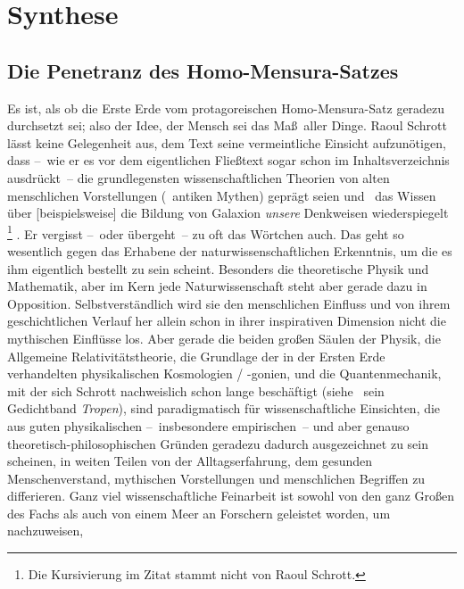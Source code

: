 \chapter{Synthese}\label{ch:synthese} %

\section{Die Penetranz des Homo-Mensura-Satzes}

Es ist, als ob die Erste Erde vom protagoreischen Homo-Mensura-Satz geradezu
  durchsetzt sei; also der Idee, der Mensch sei das Ma\ss\ aller Dinge.
Raoul Schrott lässt keine Gelegenheit aus, dem Text seine vermeintliche Einsicht
  aufzunötigen, dass --~wie er es vor dem eigentlichen Fließtext sogar schon im
  Inhaltsverzeichnis ausdrückt~-- die grundlegensten wissenschaftlichen
  Theorien von alten menschlichen Vorstellungen (\zB\ antiken Mythen) geprägt seien
  und \zB\ \glqq das Wissen über [beispielsweise] die Bildung von Galaxion 
  \emph{unsere} Denkweisen wiederspiegelt\grqq
  \footnote{Die Kursivierung im Zitat stammt nicht von Raoul Schrott.}
  \citep[S. 5]{Schrott2016ErsteErde}.
Er vergisst --~oder übergeht~-- zu oft das Wörtchen \glqq auch\grqq.
Das geht so wesentlich gegen das Erhabene der naturwissenschaftlichen
  Erkenntnis, um die es ihm eigentlich bestellt zu sein scheint. 
Besonders die theoretische Physik und Mathematik, aber im Kern jede
  Naturwissenschaft steht aber gerade dazu in Opposition.
Selbstverständlich wird sie den menschlichen Einfluss und von ihrem
  geschichtlichen Verlauf her allein schon in ihrer inspirativen Dimension
  nicht die mythischen Einflüsse los.
Aber gerade die beiden großen Säulen der Physik, die Allgemeine
  Relativitätstheorie, die Grundlage der in der Ersten Erde verhandelten
  physikalischen Kosmologien / -gonien, und die Quantenmechanik, mit der sich
  Schrott nachweislich schon lange beschäftigt (siehe \zB\ sein Gedichtband
  \emph{Tropen}), sind paradigmatisch für wissenschaftliche Einsichten, die
  aus guten physikalischen --~insbesondere empirischen~-- und aber genauso 
  theoretisch-philosophischen Gründen geradezu dadurch ausgezeichnet zu sein
  scheinen, in weiten Teilen von der Alltagserfahrung, dem gesunden
  Menschenverstand, mythischen Vorstellungen und menschlichen Begriffen zu
  differieren.
Ganz viel wissenschaftliche Feinarbeit ist sowohl von den ganz Großen des
  Fachs als auch von einem Meer an Forschern geleistet worden, um nachzuweisen,
